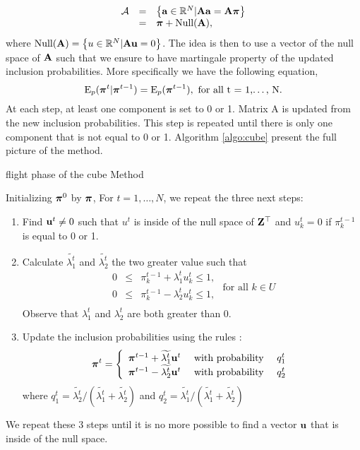 \documentclass[12pt,english]{article}\usepackage[]{graphicx}\usepackage{xcolor}
\begin{document}
$$\begin{array}{cll}\mathcal{A} &=& \left\{ {\bf a} \in \mathbb{R}^N | {\bf A}{\bf a} = {\bf A}\boldsymbol{\pi} \right\}\\
&=& \boldsymbol{\pi} + \text{Null}({\bf A}),
\end{array}
$$
where $\text{Null}({\bf A}) = \left\{u \in \mathbb{R}^N | {\bf A}{\bf u} = 0 \right\}$. The idea is then to use a vector of the null space of ${\bf A}$ such that we ensure to have martingale property of the updated inclusion probabilities. More specifically we have the following equation,
$$ {\rm E}_p(\boldsymbol{\pi}^t | \boldsymbol{\pi}^{t-1}) = {\rm E}_p(\boldsymbol{\pi}^{t-1}), \text{ for all t = 1,\dots, N}.$$
At each step, at least one component is set to 0 or 1. Matrix A is updated from the new inclusion probabilities. This step is repeated until there is only one component that is not equal to 0 or 1. Algorithm \ref{algo:cube} present the full picture of the method.

\begin{algorithm}
\caption{flight phase of the cube Method}\label{algo:cube}
Initializing $\boldsymbol{\pi}^0$ by $\boldsymbol{\pi}$, For $t = 1,\dots,N$, we repeat the three next steps:

\begin{enumerate}
\item Find ${\bf u}^t \neq 0$ such that $u^t$ is inside of the null space of ${\bf Z}^\top$ and $u_k^t = 0$ if $\pi_k^{t-1}$ is equal to 0 or 1.

\item Calculate $\widetilde{\lambda_1^t}$ and $\widetilde{\lambda_2^t}$ the two greater value such that
$$\begin{array}{ccccc} 0 &\leqslant & \pi_k^{t-1} + \lambda_1^t u_k^t \leqslant 1,\\
0 &\leqslant & \pi_k^{t-1} - \lambda_2^t u_k^t \leqslant 1,\\
 \end{array} \text{ for all } k \in U$$
Observe that $\lambda_1^t $ and $\lambda_2^t$ are both greater than 0.
 \item Update the inclusion probabilities using the rules :
 $$\boldsymbol{\pi}^t = \left\{\begin{array}{cccc}
 \boldsymbol{\pi}^{t-1} + \widetilde{\lambda_1^t}{\bf u}^t & \text{ with probability } & q_1^t\\
 \boldsymbol{\pi}^{t-1} - \widetilde{\lambda_2^t}{\bf u}^t & \text{ with probability } & q_2^t
 \end{array}\right.$$
 where $q_1^t = \widetilde{\lambda_2^t}/(\widetilde{\lambda_1^t} + \widetilde{\lambda_2^t})$ and  $q_2^t = \widetilde{\lambda_1^t}/(\widetilde{\lambda_1^t} + \widetilde{\lambda_2^t})$

\end{enumerate}
We repeat these 3 steps until it is no more possible to find a vector ${\bf u}$ that is inside of the null space.
\end{algorithm}
\end{document}
